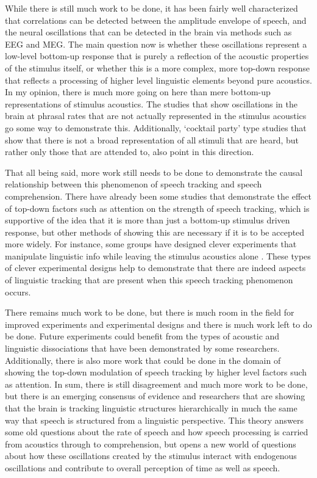 \documentclass[titlepage]{article}
\begin{document}
    While there is still much work to be done, it has been fairly well 
    characterized that correlations can be detected between the amplitude envelope
    of speech, and the neural oscillations that can be detected in the brain 
    via methods such as EEG and MEG. The main question now is whether these 
    oscillations represent a low-level bottom-up response that is purely a 
    reflection of the acoustic properties of the stimulus itself, or whether 
    this is a more complex, more top-down response that reflects a processing 
    of higher level linguistic elements beyond pure acoustics. In my opinion, 
    there is much more going on here than mere bottom-up representations of 
    stimulus acoustics. The studies that show oscillations in the brain at 
    phrasal rates that are not actually represented in the stimulus acoustics 
    go some way to demonstrate this. Additionally, `cocktail party' type studies
    that show that there is not a broad representation of all stimuli that are 
    heard, but rather only those that are attended to, also point in this 
    direction.

    That all being said, more work still needs to be done to demonstrate the 
    causal relationship between this phenomenon of speech tracking and speech 
    comprehension. There have already been some studies that demonstrate the 
    effect of top-down factors such as attention on the strength of speech 
    tracking, which is supportive of the idea that it is more than just
    a bottom-up stimulus driven response, but other methods of showing this are 
    necessary if it is to be accepted more widely. For instance, some groups 
    have designed clever experiments that manipulate linguistic info while 
    leaving the stimulus acoustics alone \cite{Ding2015,Kayser2015}. These 
    types of clever experimental designs help to demonstrate that there are 
    indeed aspects of linguistic tracking that are present when this speech tracking 
    phenomenon occurs. 

    There remains much work to be done, but there is much room in the field 
    for improved experiments and experimental designs and there is much work 
    left to do be done. Future experiments could benefit from the types of 
    acoustic and linguistic dissociations that have been demonstrated by some 
    researchers. Additionally, there is also more work that could be done in the 
    domain of showing the top-down modulation of speech tracking by higher level
    factors such as attention. In sum, there is still disagreement and much
    more work to be done, but there is an emerging consensus of evidence and 
    researchers that are showing that the brain is tracking linguistic 
    structures hierarchically in much the same way that speech is structured 
    from a linguistic perspective. This theory answers some old questions about 
    the rate of speech and how speech processing is carried from acoustics 
    through to comprehension, but opens a new world of questions about how 
    these oscillations created by the stimulus interact with endogenous oscillations 
    and contribute to overall perception of time as well as speech.
\end{document}
